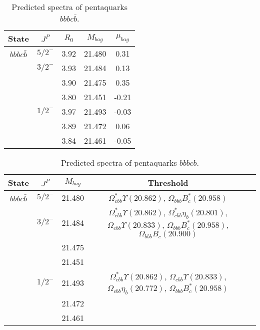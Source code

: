 \documentclass[prd,twocolumn,floatfix,nofootinbib]{revtex4}
\begin{document}
\renewcommand{\tabcolsep}{0.5cm}
\renewcommand{\arraystretch}{1.2}
\begin{table*}[!htbp]
    \caption{Predicted spectra of pentaquarks $bbbc\bar{b}$.}
    \begin{tabular}{ccccc}
        \hline\hline
        {\rm State} &$J^{P}$ &$R_{0}$ &$M_{bag}$ &$\mu_{bag}$ \\ \hline
        ${bbbc\bar{b}}$
            &${5/2}^{-}$    &3.92   &21.480 &0.31 \\
            &${3/2}^{-}$    &3.93   &21.484 &0.13 \\
            &               &3.90   &21.475 &0.35 \\
            &               &3.80   &21.451 &-0.21 \\
            &${1/2}^{-}$    &3.97   &21.493 &-0.03 \\
            &               &3.89   &21.472 &0.06 \\
            &               &3.84   &21.461 &-0.05 \\
        \hline\hline
    \end{tabular}
\end{table*}

\renewcommand{\tabcolsep}{0.5cm}
\renewcommand{\arraystretch}{1.2}
\begin{table*}[!htbp]
    \caption{Predicted spectra of pentaquarks $bbbc\bar{b}$.}
    \begin{tabular}{ccccc}
        \hline\hline
        {\rm State} &$J^{P}$ &$M_{bag}$ &Threshold \\ \hline
        ${bbbc\bar{b}}$
            &${5/2}^{-}$    &21.480 &$\Omega^{\ast}_{cbb} \Upsilon(20.862)$, $\Omega_{bbb} B^{\ast}_{c}(20.958)$ \\
            &${3/2}^{-}$    &21.484 &$\Omega^{\ast}_{cbb} \Upsilon(20.862)$, $\Omega^{\ast}_{cbb} \eta_{b}(20.801)$, $\Omega_{cbb} \Upsilon(20.833)$, $\Omega_{bbb} B^{\ast}_{c}(20.958)$, $\Omega_{bbb} B_{c}(20.900)$ \\
            &               &21.475 & \\
            &               &21.451 & \\
            &${1/2}^{-}$    &21.493 &$\Omega^{\ast}_{cbb} \Upsilon(20.862)$, $\Omega_{cbb} \Upsilon(20.833)$, $\Omega_{cbb} \eta_{b}(20.772)$, $\Omega_{bbb} B^{\ast}_{c}(20.958)$ \\
            &               &21.472 & \\
            &               &21.461 & \\
        \hline\hline
    \end{tabular}
\end{table*}
\end{document}
